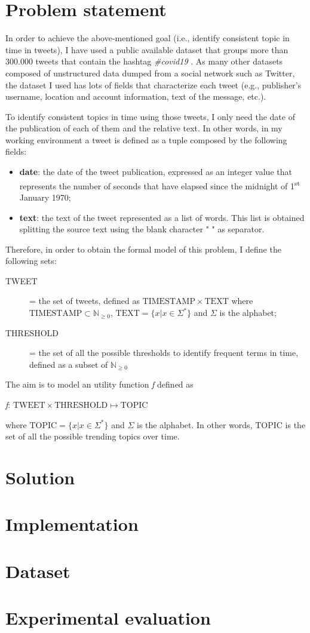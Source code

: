 \section{Problem statement}
In order to achieve the above-mentioned goal (i.e., identify consistent topic in time in tweets), I have used a public available dataset that groups more than 300.000 tweets that contain the hashtag \textit{\#covid19} \cite{covid19-tweets-dataset}. As many other datasets composed of unstructured data dumped from a social network such as Twitter, the dataset I used has lots of fields that characterize each tweet (e.g., publisher's username, location and account information, text of the message, etc.). 

To identify consistent topics in time using those tweets, I only need the date of the publication of each of them and the relative text. In other words, in my working environment a tweet is defined as a tuple composed by the following fields:
\begin{itemize}
	\item \textbf{date}: the date of the tweet publication, expressed as an integer value that represents the number of seconds that have elapsed since the midnight of 1\textsuperscript{st} January 1970;
	\item \textbf{text}: the text of the tweet represented as a list of words. This list is obtained splitting the source text using the blank character " " as separator.
\end{itemize}

Therefore, in order to obtain the formal model of this problem, I define the following sets:
\begin{description}
	\item[TWEET] = the set of tweets, defined as $\mathrm{TIMESTAMP} \times \mathrm{TEXT}$ where $\mathrm{TIMESTAMP} \subset \mathbb{N}_{\geq 0}$, $\mathrm{TEXT} = \{x | x \in \Sigma^*\}$ and $\Sigma$ is the alphabet;
	\item[THRESHOLD] = the set of all the possible thresholds to identify frequent terms in time, defined as a subset of $\mathbb{N}_{\geq 0}$
\end{description}

\noindent The aim is to model an utility function \textit{f} defined as
\begin{center}
	\textit{f}: $\mathrm{TWEET} \times \mathrm{THRESHOLD} \mapsto \mathrm{TOPIC}$
\end{center}
where $\mathrm{TOPIC} = \{x | x \in \Sigma^*\}$ and $\Sigma$ is the alphabet. In other words, $\mathrm{TOPIC}$ is the set of all the possible trending topics over time.

\section{Solution}


\section{Implementation}


\section{Dataset}


\section{Experimental evaluation}
